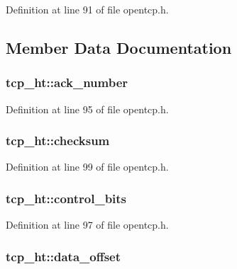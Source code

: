 Definition at line 91 of file opentcp.\+h.



\subsection{Member Data Documentation}
\subsubsection[{\texorpdfstring{ack\+\_\+number}{ack_number}}]{ tcp\+\_\+ht\+::ack\+\_\+number}\hypertarget{structtcp__ht_a350036cbf2c232d6cd2db1a431114f1d}{}\label{structtcp__ht_a350036cbf2c232d6cd2db1a431114f1d}


Definition at line 95 of file opentcp.\+h.

\subsubsection[{\texorpdfstring{checksum}{checksum}}]{ tcp\+\_\+ht\+::checksum}\hypertarget{structtcp__ht_a0868d73b5b1fc0a093a6db49053f3765}{}\label{structtcp__ht_a0868d73b5b1fc0a093a6db49053f3765}


Definition at line 99 of file opentcp.\+h.

\subsubsection[{\texorpdfstring{control\+\_\+bits}{control_bits}}]{ tcp\+\_\+ht\+::control\+\_\+bits}\hypertarget{structtcp__ht_a1c873c72bb2ce13122fa91ded3f99f81}{}\label{structtcp__ht_a1c873c72bb2ce13122fa91ded3f99f81}


Definition at line 97 of file opentcp.\+h.

\subsubsection[{\texorpdfstring{data\+\_\+offset}{data_offset}}]{ tcp\+\_\+ht\+::data\+\_\+offset}\hypertarget{structtcp__ht_a6b4becfb36132b0cd9c30995c01673d3}{}\label{structtcp__ht_a6b4becfb36132b0cd9c30995c01673d3}


